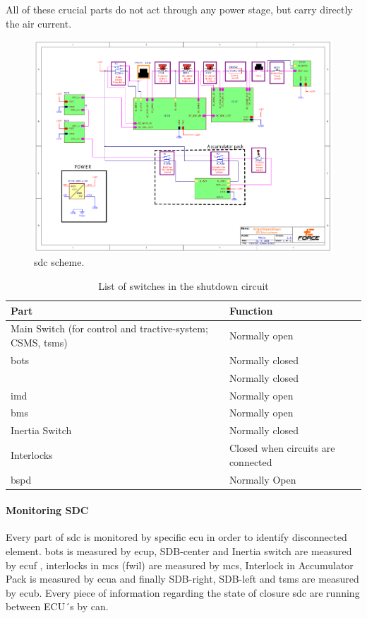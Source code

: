 All of these crucial parts do not act through any power stage, but carry directly the \gls{air} current.


\begin{figure}[H]
	\includegraphics[width=\textwidth, trim={2cm 3cm 2cm 2cm},clip]{./img/SDC-scheme.pdf}
	\caption{\gls{sdc} scheme.}
	\label{fig:SDC-scheme}
\end{figure}

\begin{table}[H]
	\caption{List of switches in the shutdown circuit}
	\centering
	\begin{tabu}{|X|l|}
		\hline Part  & Function \\
		\hline Main Switch (for control and tractive-system; CSMS, \gls{tsms}) & Normally open \\
		\hline \Acrfull{bots} & Normally closed \\
		\hline {} & Normally closed \\
		\hline \Acrfull{imd} & Normally open \\
		\hline \Acrfull{bms} & Normally open \\
		\hline Inertia Switch & Normally closed \\
		\hline Interlocks & Closed when circuits are connected \\
		\hline \Acrfull{bspd} & Normally Open \\
		\hline
	\end{tabu}%
	\label{tab:SDCswitch}%
\end{table}%

\paragraph{Monitoring SDC}
Every part of \gls{sdc} is monitored by specific \gls{ecu} in order to identify disconnected element. \gls{bots} is measured by \gls{ecup}, SDB-center  and Inertia switch are measured by \gls{ecuf} , interlocks in \glspl{mc} (\gls{fwil}) are measured by \glspl{mc}, Interlock in Accumulator Pack is measured by \gls{ecua}  and finally SDB-right, SDB-left and \gls{tsms} are measured by \gls{ecub}. Every piece of information regarding the state of closure \gls{sdc} are running between ECU´s by \gls{can}. 


